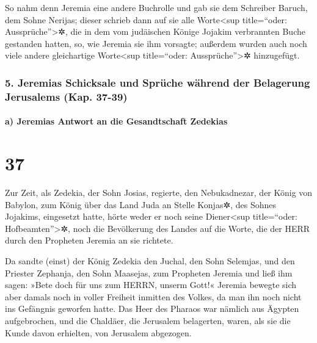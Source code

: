 So nahm denn Jeremia eine andere Buchrolle und gab sie
dem Schreiber Baruch, dem Sohne Nerijas; dieser schrieb dann auf sie
alle Worte\textless sup title=``oder: Aussprüche''\textgreater✲, die in
dem vom judäischen Könige Jojakim verbrannten Buche gestanden hatten,
so, wie Jeremia sie ihm vorsagte; außerdem wurden auch noch viele andere
gleichartige Worte\textless sup title=``oder: Aussprüche''\textgreater✲
hinzugefügt.

\hypertarget{jeremias-schicksale-und-spruxfcche-wuxe4hrend-der-belagerung-jerusalems-kap.-37-39}{%
\subsubsection{5. Jeremias Schicksale und Sprüche während der Belagerung
Jerusalems (Kap.
37-39)}\label{jeremias-schicksale-und-spruxfcche-wuxe4hrend-der-belagerung-jerusalems-kap.-37-39}}

\hypertarget{a-jeremias-antwort-an-die-gesandtschaft-zedekias}{%
\paragraph{a) Jeremias Antwort an die Gesandtschaft
Zedekias}\label{a-jeremias-antwort-an-die-gesandtschaft-zedekias}}

\hypertarget{section-36}{%
\section{37}\label{section-36}}

Zur Zeit, als Zedekia, der Sohn Josias, regierte, den
Nebukadnezar, der König von Babylon, zum König über das Land Juda an
Stelle Konjas✲, des Sohnes Jojakims, eingesetzt hatte,
hörte weder er noch seine Diener\textless sup
title=``oder: Hofbeamten''\textgreater✲, noch die Bevölkerung des Landes
auf die Worte, die der HERR durch den Propheten Jeremia an sie richtete.

Da sandte (einst) der König Zedekia den Juchal, den Sohn
Selemjas, und den Priester Zephanja, den Sohn Maasejas, zum Propheten
Jeremia und ließ ihm sagen: »Bete doch für uns zum HERRN, unserm Gott!«
Jeremia bewegte sich aber damals noch in voller Freiheit
inmitten des Volkes, da man ihn noch nicht ins Gefängnis geworfen hatte.
Das Heer des Pharaos war nämlich aus Ägypten aufgebrochen,
und die Chaldäer, die Jerusalem belagerten, waren, als sie die Kunde
davon erhielten, von Jerusalem abgezogen.


